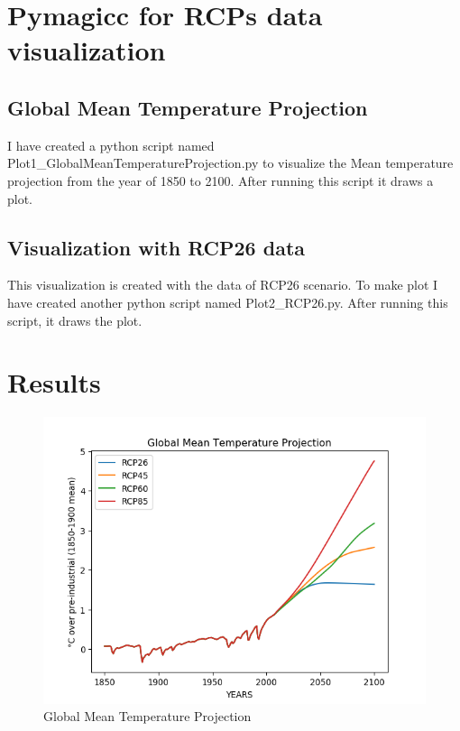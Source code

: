 \documentclass[12pt, letterpaper]{article}
\begin{document}
\section{Pymagicc for RCPs data visualization}

\subsection{Global Mean Temperature Projection}
I have created a python script named Plot1\_GlobalMeanTemperatureProjection.py  to visualize the Mean temperature projection from the year of 1850 to 2100. After running this script it draws a plot. 

\subsection{Visualization with RCP26 data}
This visualization is created with the data of RCP26 scenario. To make plot I have created another python script named Plot2\_RCP26.py. After running this script, it draws the plot.


\section{Results}
\begin{figure}
\includegraphics[width=1\textwidth]{Plot1_GlobalMeanTemperatureProjection}
\caption{Global Mean Temperature Projection}
\label{fig:Plot1_GlobalMeanTemperatureProjection}
\end{figure}
\end{document}
